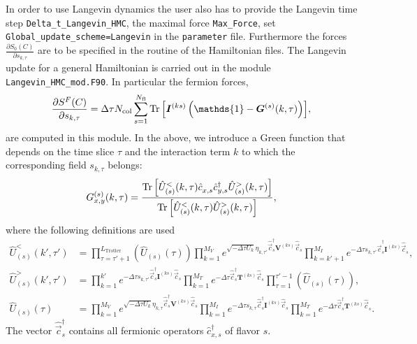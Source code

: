 In order to use Langevin dynamics the user also has to provide the Langevin time step \texttt{Delta\_t\_Langevin\_HMC},  the maximal force \texttt{Max\_Force},  set  \texttt{Global\_update\_scheme=Langevin} in the \texttt{parameter} file.  Furthermore the   forces   $ \frac{ \partial S_{0}(C)}{\partial s_{k,\tau}}  $  are to be specified in the routine   of the Hamiltonian files.  The Langevin update   for a general Hamiltonian  is carried out in the module  \texttt{Langevin\_HMC\_mod.F90}.   In particular the  fermion forces, 
\begin{equation}
 \frac { \partial S^F(C)}{\partial s_{k,\tau} } 
 	=  \Delta \tau {N_{\mathrm{col}}} \sum\limits_{s=1}^{N_{\mathrm{fl}}} \Tr{\left[ \bm{I}^{(ks)} \left(\mathds{1} - \bm{G}^{(s)}(k,\tau) \right) \right]},
\end{equation}
are computed in this module. 
In the above, we  introduce a Green function that depends on the time slice $\tau$  and the interaction term $k$ to which the corresponding field $s_{k,\tau}$ belongs:
\begin{equation}\label{eqn:green_langevin}
G_{x,y}^{(s)}(k,\tau) = \frac{\Tr{\left[ \hat{U}_{(s)}^{<}(k,\tau) \hat{c}_{x,s}^{\phantom\dagger} \hat{c}_{y,s}^{\dagger} \hat{U}_{(s)}^{>}(k,\tau) \right]} }
{\Tr{\left[ \hat{U}_{(s)}^{<}(k,\tau)\hat{U}_{(s)}^{>}(k,\tau) \right]}},
\end{equation}
where the following definitions are used
\begin{align}
 \hat{U}_{(s)}^{<}(k',\tau') &= \prod_{\tau=\tau'+1}^{L_{\text{Trotter}}}  \left( \hat{U}_{(s)}(\tau) \right)
  \prod_{k=1}^{M_V} e^{\sqrt{-\Delta\tau U_k}  \eta_{k,\tau'} \hat{\vec{c}}_{s}^{\dagger} \bm{V}^{(ks)} \hat{\vec{c}}_{s}^{\phantom\dagger}}
\prod_{k=k'+1}^{M_I} e^{-\Delta\tau s_{k,\tau'} \hat{\vec{c}}_{s}^{\dagger} \bm{I}^{(ks)} \hat{\vec{c}}_{s}^{\phantom\dagger}}, \\
 \hat{U}_{(s)}^{>}(k',\tau') &= \prod_{k=1}^{k'} e^{-\Delta \tau s_{k,\tau'}  \hat{\vec{c}}_{s}^{\dagger} \bm{I}^{(ks)} \hat{\vec{c}}_{s}^{\phantom\dagger}}
  \prod_{k=1}^{M_T}   e^{-\Delta\tau  \hat{\vec{c}}_{s}^{\dagger} \bm{T}^{(ks)} \hat{\vec{c}}_{s}^{\phantom\dagger}} 
  \prod_{\tau=1}^{\tau'-1}  \left( \hat{U}_{(s)}(\tau) \right), \\
  \hat{U}_{(s)}(\tau) &= \prod_{k=1}^{M_V} e^{\sqrt{-\Delta\tau U_k}  \eta_{k,\tau} \hat{\vec{c}}_{s}^{\dagger} \bm{V}^{(ks)} \hat{\vec{c}}_{s}^{\phantom\dagger}} 
  \prod_{k=1}^{M_I} e^{-\Delta\tau s_{k,\tau} \hat{\vec{c}}_{s}^{\dagger} \bm{I}^{(ks)} \hat{\vec{c}}_{s}^{\phantom\dagger}}
    \prod_{k=1}^{M_T}   e^{-\Delta\tau  \hat{\vec{c}}_{s}^{\dagger} \bm{T}^{(ks)} \hat{\vec{c}}_{s}^{\phantom\dagger}} .
\end{align}
The vector $\hat{\vec{c}}_s^{\dagger}$ contains all fermionic operators $\hat{c}_{x,s}^{\dagger}$ of flavor $s$.


